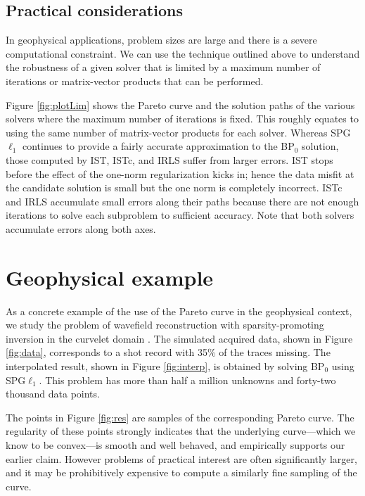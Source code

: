 \subsection{Practical considerations}
%
\mbox{}\indent In geophysical applications, problem sizes are large
and there is a severe computational constraint. We can use the
technique outlined above to understand the robustness of a given
solver that is limited by a maximum number of iterations or
matrix-vector products that can be performed.

Figure \ref{fig:plotLim} shows the Pareto curve and the solution paths
of the various solvers where the maximum number of iterations is
fixed. This roughly equates to using the same number of matrix-vector
products for each solver. Whereas SPG$\ell_1$ continues to provide a
fairly accurate approximation to the BP$_0$ solution, those computed
by IST, ISTc, and IRLS suffer from larger errors.  IST stops before
the effect of the one-norm regularization kicks in; hence the data
misfit at the candidate solution is small but the one norm is
completely incorrect. ISTc and IRLS accumulate small errors along
their paths because there are not enough iterations to solve each
subproblem to sufficient accuracy. Note that both solvers accumulate
errors along both axes.
%
%
\section{Geophysical example}

\mbox{}\indent As a concrete example of the use of the Pareto curve in
the geophysical context, we study the problem of wavefield
reconstruction with sparsity-promoting inversion in the curvelet
domain \cite[CRSI -][]{herrmann07crsi}. The simulated acquired data,
shown in Figure \ref{fig:data}, corresponds to a shot record with 35\%
of the traces missing. The interpolated result, shown in Figure
\ref{fig:interp}, is obtained by solving BP$_0$ using SPG$\ell_1$.
This problem has more than half a million unknowns and forty-two
thousand data points.

The points in Figure \ref{fig:res} are samples of the corresponding
Pareto curve.  The regularity of these points strongly indicates that
the underlying curve---which we know to be convex---is smooth and well
behaved, and empirically supports our earlier claim.  However problems
of practical interest are often significantly larger, and it may be
prohibitively expensive to compute a similarly fine sampling of the
curve.

